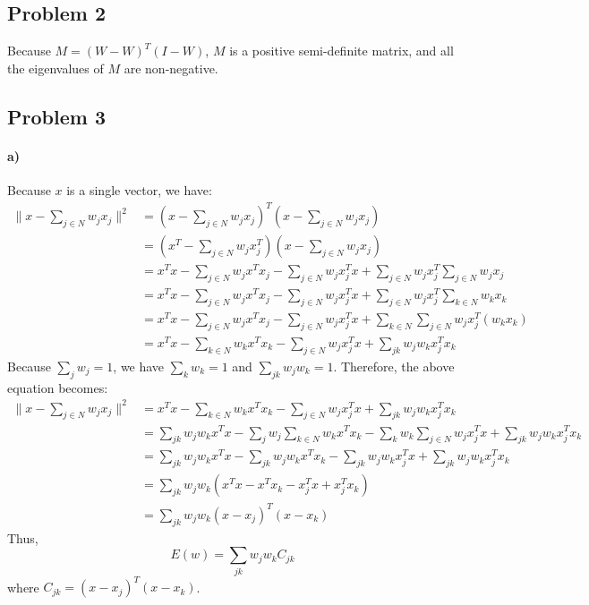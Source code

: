 \documentclass{article}
\begin{document}
\subsection*{Problem 2}
Because $M=(W-W)^T(I-W)$, $M$ is a positive semi-definite matrix, and all the eigenvalues of $M$ are non-negative. 

\subsection*{Problem 3}
\paragraph{a)} Because $x$ is a single vector, we have:
\begin{align*}
\| x - \sum_{j \in N} w_j x_j \|^2 &= (x - \sum_{j \in N} w_j x_j)^T(x - \sum_{j \in N} w_j x_j) \\
&= (x^T - \sum_{j \in N} w_j x_j^T)(x - \sum_{j \in N} w_j x_j) \\
&= x^T x - \sum_{j \in N} w_j x^T x_j - \sum_{j \in N} w_j x_j^T x + \sum_{j \in N} w_j x_j^T\sum_{j \in N} w_j x_j \\
&= x^T x - \sum_{j \in N} w_j x^T x_j - \sum_{j \in N} w_j x_j^T x + \sum_{j \in N} w_j x_j^T\sum_{k \in N} w_k x_k \\
&= x^T x - \sum_{j \in N} w_j x^T x_j - \sum_{j \in N} w_j x_j^T x + \sum_{k \in N}\sum_{j \in N} w_j x_j^T (w_k x_k) \\
&= x^T x - \sum_{k \in N} w_k x^T x_k - \sum_{j \in N} w_j x_j^T x + \sum_{jk} w_j w_k x_j^T x_k
\end{align*}
Because $\sum_{j} w_j = 1$, we have $\sum_{k} w_k = 1$ and $\sum_{jk} w_j w_k = 1$. Therefore, the above equation becomes:
\begin{align*}
\| x - \sum_{j \in N} w_j x_j \|^2 &= x^T x - \sum_{k \in N} w_k x^T x_k - \sum_{j \in N} w_j x_j^T x + \sum_{jk} w_j w_k x_j^T x_k \\
&= \sum_{jk} w_j w_k x^T x - \sum_{j} w_j \sum_{k \in N} w_k x^T x_k - \sum_{k} w_k \sum_{j \in N} w_j x_j^T x + \sum_{jk} w_j w_k x_j^T x_k \\
&= \sum_{jk} w_j w_k x^T x - \sum_{jk} w_j w_k x^T x_k - \sum_{jk} w_j w_k x_j^T x + \sum_{jk} w_j w_k x_j^T x_k \\
&= \sum_{jk} w_j w_k (x^T x - x^T x_k - x_j^T x + x_j^T x_k) \\
&= \sum_{jk} w_j w_k (x-x_j)^T(x-x_k)
\end{align*}
Thus, \[ E(w) = \sum_{jk} w_j w_k C_{jk} \] where $C_{jk} = (x-x_j)^T(x-x_k)$.
\end{document}
